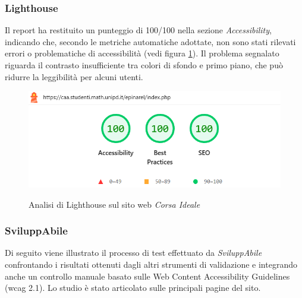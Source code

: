 \subsubsection{Lighthouse}
\noindent Il report ha restituito un punteggio di 100/100 nella sezione \textit{Accessibility}, indicando che, secondo le metriche automatiche adottate, non sono stati rilevati errori o problematiche di accessibilità (vedi figura \ref{fig:Lighthouse_corsaideale}). 
Il problema segnalato riguarda il contrasto insufficiente tra colori di sfondo e primo piano, che può ridurre la leggibilità per alcuni utenti. 
\begin{figure}[H]
    \centering
    \includegraphics[width=0.6\linewidth, alt={Screenshot dell'analisi di Lighthouse sul sito web Corsa Ideale}]{img/Lighthouse_corsaideale.png}
    \caption{Analisi di Lighthouse sul sito web \textit{Corsa Ideale}}\label{fig:Lighthouse_corsaideale}
\end{figure}

\subsubsection{SviluppAbile}
\noindent Di seguito viene illustrato il processo di test effettuato da \textit{SviluppAbile} confrontando i risultati ottenuti dagli altri strumenti di validazione e integrando anche un controllo manuale basato sulle Web Content Accessibility Guidelines (\acrshort{wcag} 2.1). Lo studio è stato articolato sulle principali pagine del sito.\\

